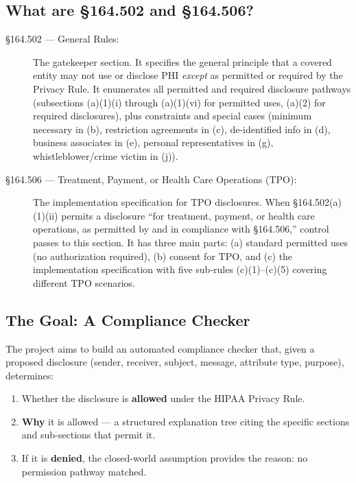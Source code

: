 \documentclass[11pt,letterpaper]{article}
\begin{document}
\subsection{What are \S 164.502 and \S 164.506?}

\begin{description}
  \item[\S 164.502 --- General Rules:] The gatekeeper section. It specifies the general principle that a covered entity may not use or disclose PHI \emph{except} as permitted or required by the Privacy Rule. It enumerates all permitted and required disclosure pathways (subsections (a)(1)(i) through (a)(1)(vi) for permitted uses, (a)(2) for required disclosures), plus constraints and special cases (minimum necessary in (b), restriction agreements in (c), de-identified info in (d), business associates in (e), personal representatives in (g), whistleblower/crime victim in (j)).

  \item[\S 164.506 --- Treatment, Payment, or Health Care Operations (TPO):] The implementation specification for TPO disclosures. When \S 164.502(a)(1)(ii) permits a disclosure ``for treatment, payment, or health care operations, as permitted by and in compliance with \S 164.506,'' control passes to this section. It has three main parts: (a) standard permitted uses (no authorization required), (b) consent for TPO, and (c) the implementation specification with five sub-rules (c)(1)--(c)(5) covering different TPO scenarios.
\end{description}

\subsection{The Goal: A Compliance Checker}

The project aims to build an automated compliance checker that, given a proposed disclosure (sender, receiver, subject, message, attribute type, purpose), determines:
\begin{enumerate}
  \item Whether the disclosure is \textbf{allowed} under the HIPAA Privacy Rule.
  \item \textbf{Why} it is allowed --- a structured explanation tree citing the specific sections and sub-sections that permit it.
  \item If it is \textbf{denied}, the closed-world assumption provides the reason: no permission pathway matched.
\end{enumerate}
\end{document}
